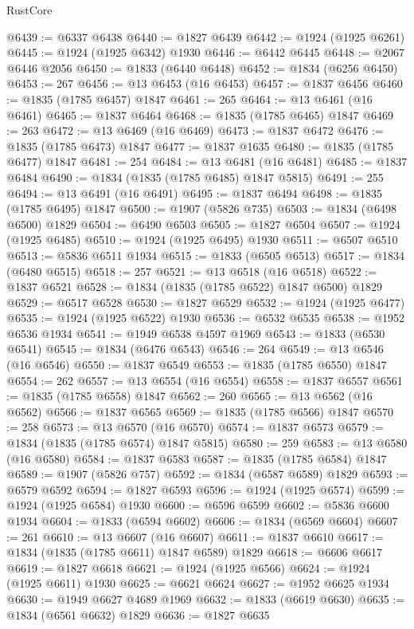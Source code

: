 \begin{lexlean}{RustCore}
\begin{coremodule}
@6439 := @6337 @6438
@6440 := @1827 @6439
@6442 := @1924 (@1925 @6261)
@6445 := @1924 (@1925 @6342) @1930
@6446 := @6442 @6445
@6448 := @2067 @6446 @2056
@6450 := @1833 (@6440 @6448)
@6452 := @1834 (@6256 @6450)
@6453 := 267
@6456 := @13 @6453 (@16 @6453)
@6457 := @1837 @6456
@6460 := @1835 (@1785 @6457) @1847
@6461 := 265
@6464 := @13 @6461 (@16 @6461)
@6465 := @1837 @6464
@6468 := @1835 (@1785 @6465) @1847
@6469 := 263
@6472 := @13 @6469 (@16 @6469)
@6473 := @1837 @6472
@6476 := @1835 (@1785 @6473) @1847
@6477 := @1837 @1635
@6480 := @1835 (@1785 @6477) @1847
@6481 := 254
@6484 := @13 @6481 (@16 @6481)
@6485 := @1837 @6484
@6490 := @1834 (@1835 (@1785 @6485) @1847 @5815)
@6491 := 255
@6494 := @13 @6491 (@16 @6491)
@6495 := @1837 @6494
@6498 := @1835 (@1785 @6495) @1847
@6500 := @1907 (@5826 @735)
@6503 := @1834 (@6498 @6500) @1829
@6504 := @6490 @6503
@6505 := @1827 @6504
@6507 := @1924 (@1925 @6485)
@6510 := @1924 (@1925 @6495) @1930
@6511 := @6507 @6510
@6513 := @5836 @6511 @1934
@6515 := @1833 (@6505 @6513)
@6517 := @1834 (@6480 @6515)
@6518 := 257
@6521 := @13 @6518 (@16 @6518)
@6522 := @1837 @6521
@6528 := @1834 (@1835 (@1785 @6522) @1847 @6500) @1829
@6529 := @6517 @6528
@6530 := @1827 @6529
@6532 := @1924 (@1925 @6477)
@6535 := @1924 (@1925 @6522) @1930
@6536 := @6532 @6535
@6538 := @1952 @6536 @1934
@6541 := @1949 @6538 @4597 @1969
@6543 := @1833 (@6530 @6541)
@6545 := @1834 (@6476 @6543)
@6546 := 264
@6549 := @13 @6546 (@16 @6546)
@6550 := @1837 @6549
@6553 := @1835 (@1785 @6550) @1847
@6554 := 262
@6557 := @13 @6554 (@16 @6554)
@6558 := @1837 @6557
@6561 := @1835 (@1785 @6558) @1847
@6562 := 260
@6565 := @13 @6562 (@16 @6562)
@6566 := @1837 @6565
@6569 := @1835 (@1785 @6566) @1847
@6570 := 258
@6573 := @13 @6570 (@16 @6570)
@6574 := @1837 @6573
@6579 := @1834 (@1835 (@1785 @6574) @1847 @5815)
@6580 := 259
@6583 := @13 @6580 (@16 @6580)
@6584 := @1837 @6583
@6587 := @1835 (@1785 @6584) @1847
@6589 := @1907 (@5826 @757)
@6592 := @1834 (@6587 @6589) @1829
@6593 := @6579 @6592
@6594 := @1827 @6593
@6596 := @1924 (@1925 @6574)
@6599 := @1924 (@1925 @6584) @1930
@6600 := @6596 @6599
@6602 := @5836 @6600 @1934
@6604 := @1833 (@6594 @6602)
@6606 := @1834 (@6569 @6604)
@6607 := 261
@6610 := @13 @6607 (@16 @6607)
@6611 := @1837 @6610
@6617 := @1834 (@1835 (@1785 @6611) @1847 @6589) @1829
@6618 := @6606 @6617
@6619 := @1827 @6618
@6621 := @1924 (@1925 @6566)
@6624 := @1924 (@1925 @6611) @1930
@6625 := @6621 @6624
@6627 := @1952 @6625 @1934
@6630 := @1949 @6627 @4689 @1969
@6632 := @1833 (@6619 @6630)
@6635 := @1834 (@6561 @6632) @1829
@6636 := @1827 @6635

\end{coremodule}
\end{lexlean}
